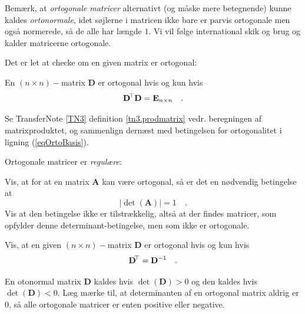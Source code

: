 \begin{info}
Bemærk, at {\em{ortogonale matricer}} alternativt (og måske mere betegnende) kunne kaldes {\em{ortonormale}}, idet søjlerne i matricen ikke bare er parvis ortogonale men også normerede, så de alle har længde $1$. Vi vil følge international skik og brug og kalder matricerne ortogonale.
\end{info}

Det er let at checke om en given matrix er ortogonal:

\begin{theorem}
En $(n \times n)-$matrix $\mathbf{D}$ er ortogonal hvis og kun hvis
\begin{equation}
\mathbf{D}\hspace*{-.6mm}^{\top} \mathbf{D} = \mathbf{E}_{n \times n} \quad .
\end{equation}
\end{theorem}
\begin{bevis}
Se TransferNote \ref{TN3} definition \ref{tn3.prodmatrix} vedr. beregningen af matrixproduktet, og sammenlign dernæst med betingelsen for ortogonalitet i ligning (\ref{eqOrtoBasis}).
\end{bevis}

Ortogonale matricer er {\em{regulære}}:

\begin{exercise}
Vis, at for at en matrix $\mathbf{A}$ kan være ortogonal, så er det en nødvendig betingelse at
\begin{equation}
| \det(\mathbf{A}) |  = 1 \quad .
\end{equation}
Vis at den betingelse ikke er tilstrækkelig, altså at der findes matricer, som opfylder denne determinant-betingelse, men som ikke er ortogonale.
\end{exercise}

\begin{exercise}
Vis, at en given $(n \times n)-$matrix $\mathbf{D}$ er ortogonal hvis og kun hvis
\begin{equation}
\mathbf{D}\hspace*{-.6mm}^{\top} = \mathbf{D}^{-1} \quad .
\end{equation}
\end{exercise}


\begin{definition}
En otonormal matrix $\mathbf{D}$ kaldes  hvis  $\det(\mathbf{D}) > 0$ og
den kaldes   hvis  $\det(\mathbf{D}) < 0$. Læg mærke til, at determinanten af en ortogonal matrix aldrig er $0$, så alle ortogonale matricer er enten positive eller negative.
\end{definition}

